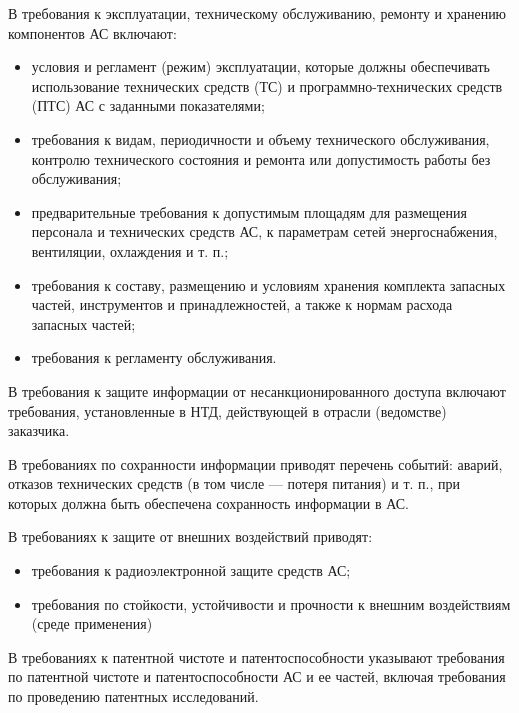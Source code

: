 {В требования к эксплуатации, техническому обслуживанию, ремонту и хранению компонентов АС включают:
\begin{itemize}
  \item условия и регламент (режим) эксплуатации, которые должны обеспечивать использование технических средств (ТС) и программно-технических средств (ПТС) АС с заданными показателями;
  \item требования к видам, периодичности и объему технического обслуживания, контролю технического состояния и ремонта или допустимость работы без обслуживания;
  \item предварительные требования к допустимым площадям для размещения персонала и технических средств АС, к параметрам сетей энергоснабжения, вентиляции, охлаждения и т. п.;
  \item требования к составу, размещению и условиям хранения комплекта запасных частей, инструментов и принадлежностей, а также к нормам расхода запасных частей;
  \item требования к регламенту обслуживания.
\end{itemize}
В требования к защите информации от несанкционированного доступа включают требования, установленные в НТД, действующей в отрасли (ведомстве) заказчика.

В требованиях по сохранности информации приводят перечень событий: аварий, отказов технических средств (в том числе — потеря питания) и т. п., при которых должна быть обеспечена сохранность информации в АС.

В требованиях к защите от внешних воздействий приводят:
\begin{itemize}
  \item требования к радиоэлектронной защите средств АС;
  \item требования по стойкости, устойчивости и прочности к внешним воздействиям (среде применения)
\end{itemize}

В требованиях к патентной чистоте и патентоспособности указывают требования по патентной чистоте и патентоспособности АС и ее частей, включая требования по проведению патентных исследований.

}
